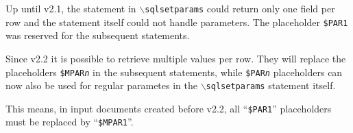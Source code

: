 \documentclass{article}
\newcommand{\bs}{\ensuremath{\backslash}}
\newcommand{\vs}{\vspace{3mm}}
\begin{document}
Up until v2.1, the statement in \texttt{\bs sqlsetparams} could return only one field per row and the statement itself could not handle parameters. The placeholder \texttt{\$PAR1} was reserved for the subsequent statements.

Since v2.2 it is possible to retrieve multiple values per row. They will replace the placeholders \texttt{\$MPAR\textit{n}} in the subsequent statements, while \texttt{\$PAR\textit{n}} placeholders can now also be used for regular parametes in the \texttt{\bs sqlsetparams} statement itself.

\vs

This means, in input documents created before v2.2, all  ``\texttt{\$PAR1}'' placeholders must be replaced by ``\texttt{\$MPAR1}''.
\end{document}
